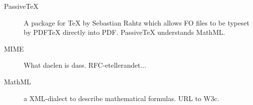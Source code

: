\begin{description}
\item[PassiveTeX] A package for {\TeX} by Sebastian Rahtz which allows
  FO files to be typeset by PDF{\TeX} directly into PDF.  PassiveTeX
  understands MathML.

\item[MIME] \textsf{What daelen is dass. RFC-etellerandet...}

\item[MathML] a XML-dialect to describe mathematical formulas.
  \textsf{URL to W3c}.
\end{description}

  

    
